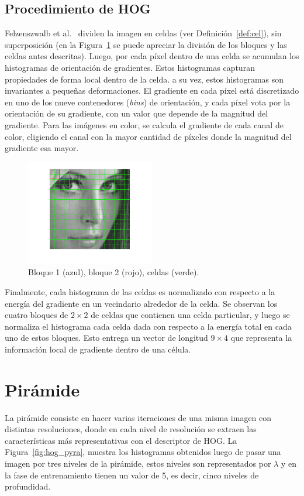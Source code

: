 \subsection{Procedimiento de HOG}
Felzenszwalb et al.~\cite{Felzenszwalb2010} dividen la imagen en celdas (ver Definición~\ref{def:cel}), sin superposición (en la Figura~\ref{fig:blocks_cells} se puede apreciar la división de los bloques y las celdas antes descritas). Luego, por cada píxel dentro de una celda se acumulan los histogramas de orientación de gradientes. Estos histogramas capturan propiedades de forma local dentro de la celda. a su vez, estos histogramas son invariantes a pequeñas deformaciones.
El gradiente en cada píxel está discretizado en uno de los nueve contenedores (\textit{bins}) de orientación, y cada píxel vota por la orientación de su gradiente, con un valor que depende de la magnitud del gradiente. Para las imágenes en color, se calcula el gradiente de cada canal de color, eligiendo el canal con la mayor cantidad de píxeles donde la magnitud del gradiente esa mayor. 

\begin{figure}[tb]
  \centering
   \includegraphics[width=0.5\textwidth]{Figuras/lena-grid.png}
   \caption{Bloque 1 (azul), bloque 2 (rojo), celdas (verde).}
   \label{fig:blocks_cells}
\end{figure}

Finalmente, cada histograma de las celdas es normalizado con respecto a la energía del gradiente en un vecindario alrededor de la celda. Se observan los cuatro bloques de $2 \times 2$ de celdas que contienen una celda particular, y luego se normaliza el histograma cada celda dada con respecto a la energía total en cada uno de estos bloques. Esto entrega un vector de longitud $9 \times 4$ que representa la información local de gradiente dentro de una célula.

\section{Pirámide}\label{sec:pyra}
La pirámide consiste en hacer varias iteraciones de una misma imagen con distintas resoluciones, donde en cada nivel de resolución se extraen las características más representativas con el descriptor de HOG\@. La Figura~\ref{fig:hog_pyra}, muestra los histogramas obtenidos luego de pasar una imagen por tres niveles de la pirámide, estos niveles son representados por $\lambda$ y en la fase de entrenamiento tienen un valor de 5, es decir, cinco niveles de profundidad.

